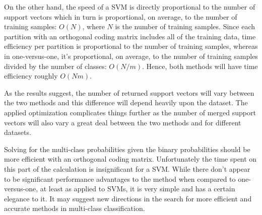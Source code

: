 On the other hand, the speed of a SVM is directly proportional to the number 
of support vectors which in turn is proportional, on average,
to the number of training samples: 
$O(N)$, where $N$ is the number of training samples.
Since each partition with an orthogonal coding matrix includes all of the
training data, time efficiency per partition is proportional to the number
of training samples, whereas in one-versus-one, it's proportional, on average,
to the number of training samples divided by the number of classes: $O(N/m)$.
Hence, both methods will have time efficiency roughly $O(Nm)$.

As the results suggest, the number of returned support vectors will vary 
between the two methods and this difference will depend heavily upon the 
dataset.
The applied optimization complicates things further as the number of merged
support vectors will also vary a great deal between the two methods and
for different datasets.

Solving for the multi-class probabilities given the binary probabilities should
be more efficient with an orthogonal coding matrix. 
Unfortunately the time
spent on this part of the calculation is insignificant for a SVM.
While there don't appear to be significant performance advantages to the method
when compared to one-versus-one, at least as applied to SVMs, 
it is very simple and has a certain elegance to it.
It may suggest new directions in the search for more efficient and
accurate methods in multi-class classification.

